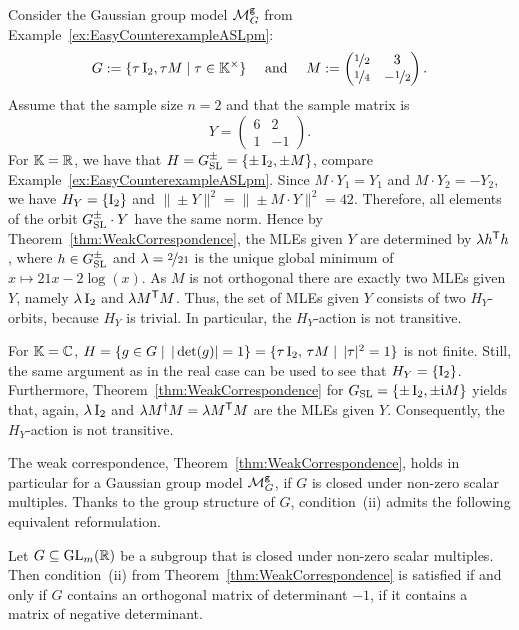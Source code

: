 \begin{example}\label{ex:MLEsStabilizer}
	Consider the Gaussian group model $\mathcal{M}^{\mathtt{g}}_G$ from Example~\ref{ex:EasyCounterexampleASLpm}:
	\[G := \{ \tau \operatorname{I}_2,  \tau M \mid \tau \in \mathbb K^{\times} \} \quad \text{ and } \quad M := \begin{pmatrix}
		\nicefrac{1}{2} & 3 \\ \nicefrac{1}{4} & - \nicefrac{1}{2}
	\end{pmatrix}. \]
	Assume that the sample size $n=2$ and that the sample matrix is
		\[ Y = \begin{pmatrix}
			6 & 2 \\ 1 & -1
		\end{pmatrix}. \]
	For $\mathbb K = \mathbb R$, we have that $H = G_{\operatorname{SL}}^{\pm} = \{\pm \operatorname{I}_2, \pm M\}$, compare Example~\ref{ex:EasyCounterexampleASLpm}. Since $M \cdot Y_1 = Y_1$ and $M \cdot Y_2 = -Y_2$, we have $H_Y = \{\operatorname{I}_2\}$ and $\| \pm Y\|^2 = \|\pm M \cdot Y \|^2 = 42$. Therefore, all elements of the orbit $G_{\operatorname{SL}}^{\pm} \cdot Y$ have the same norm. Hence by Theorem~\ref{thm:WeakCorrespondence}, the MLEs given $Y$ are determined by $\lambda h^{\mathsf{T}} h$, where $h \in G_{\operatorname{SL}}^{\pm}$ and $\lambda = \nicefrac{2}{21}$ is the unique global minimum of $x \mapsto 21x - 2\log(x)$. As $M$ is not orthogonal there are exactly two MLEs given $Y$, namely $\lambda \operatorname{I}_2$ and $\lambda M^{\mathsf{T}} M$. Thus, the set of MLEs given $Y$ consists of two $H_Y$-orbits, because $H_Y$ is trivial. In particular, the $H_Y$-action is not transitive.
	
	For $\mathbb K = \mathbb C$, $H = \{g \in G \mid \, |\det(g)|=1\} = \{\tau \operatorname{I}_2, \, \tau M \mid \, |\tau|^2 = 1\}$ is not finite. Still, the same argument as in the real case can be used to see that $H_Y = \{ \operatorname{I}_2 \}$. Furthermore, Theorem~\ref{thm:WeakCorrespondence} for $G_{\operatorname{SL}} = \{\pm \operatorname{I}_2, \pm \mathfrak{i} M\}$ yields that, again, $\lambda \operatorname{I}_2$ and $\lambda M^{\dagger} M  =\lambda M^{\mathsf{T}} M$ are the MLEs given $Y$. Consequently, the $H_Y$-action is not transitive.
	\hfill\exSymbol
\end{example}


The weak correspondence, Theorem~\ref{thm:WeakCorrespondence}, holds in particular for a Gaussian group model $\mathcal{M}^{\mathtt{g}}_G$, if $G$ is closed under non-zero scalar multiples. Thanks to the group structure of $G$, condition~(ii) admits the following equivalent reformulation.

\begin{lemma}\label{lem:ASLforGaussianGroupModels}
	Let $G \subseteq \operatorname{GL}_m(\mathbb R)$ be a subgroup that is closed under non-zero scalar multiples. Then condition~(ii) from Theorem~\ref{thm:WeakCorrespondence} is satisfied if and only if $G$ contains an orthogonal matrix of determinant $-1$, if it contains a matrix of negative determinant.
\end{lemma}

